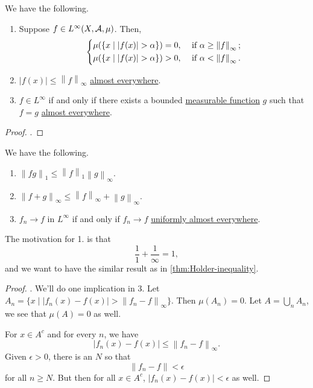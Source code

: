 \begin{lemma}
	We have the following.
	\begin{enumerate}
		\item Suppose \(f\in L^{\infty} (X, \mathcal{\MakeUppercase{a}} , \mu )\). Then,
		      \[
			      \begin{dcases}
				      \mu (\{x\mid \left\vert f(x) \right\vert > \alpha \}) = 0, & \text{ if } \alpha \geq \left\lVert f\right\rVert _\infty; \\
				      \mu (\{x\mid \left\vert f(x) \right\vert > \alpha \}) > 0, & \text{ if } \alpha < \left\lVert f\right\rVert _\infty.    \\
			      \end{dcases}
		      \]
		\item \(\left\vert f(x) \right\vert \leq \left\lVert f\right\rVert _\infty \) \hyperref[def:mu-almost-everywhere]{almost everywhere}.
		\item \(f\in L^{\infty} \) if and only if there exists a bounded \hyperref[def:measurable-function]{measurable function} \(g\) such that \(f = g\) \hyperref[def:mu-almost-everywhere]{almost everywhere}.
	\end{enumerate}
\end{lemma}
\begin{proof}
	.
\end{proof}

\begin{theorem}
	We have the following.
	\begin{enumerate}
		\item \(\left\lVert fg\right\rVert _1 \leq \left\lVert f\right\rVert _1 \left\lVert g\right\rVert _\infty \).
		\item \(\left\lVert f + g\right\rVert _\infty \leq \left\lVert f\right\rVert _\infty + \left\lVert g\right\rVert _\infty \).
		\item \(f_{n} \to f\) in \(L^{\infty} \) if and only if \(f_{n} \to f\) \hyperref[def:uniformly-almost-everywhere]{uniformly almost everywhere}.
	\end{enumerate}
\end{theorem}
\begin{remark}
	The motivation for 1. is that
	\[
		\frac{1}{1} + \frac{1}{\infty } = 1,
	\]
	and we want to have the similar result as in \autoref{thm:Holder-inequality}.
\end{remark}
\begin{proof}
	.
	We'll do one implication in 3. Let \(A_{n} = \{x\mid \left\vert f_{n} (x) - f(x) \right\vert > \left\lVert f_{n} - f\right\rVert_\infty  \}\). Then \(\mu (A_{n} ) = 0\). Let \(A = \bigcup_{n} A_{n} \),
	we see that \(\mu (A)= 0\) as well.

	For \(x\in A^{c} \) and for every \(n\), we have
	\[
		\left\vert f_{n} (x) - f(x) \right\vert \leq \left\lVert f_{n} - f\right\rVert _\infty .
	\]
	Given \(\epsilon >0\), there is an \(N\) so that
	\[
		\left\lVert f_{n} - f\right\rVert < \epsilon
	\]
	for all \(n\geq N\). But then for all \(x\in A^{c} \), \(\left\vert f_{n} (x) - f(x) \right\vert <\epsilon \) as well.
\end{proof}

